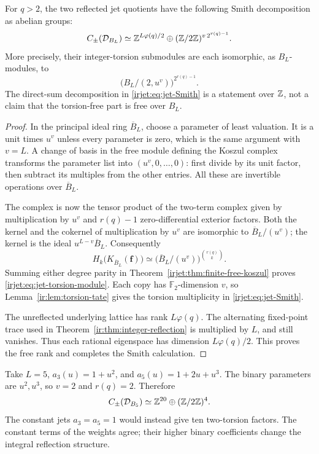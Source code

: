 \begin{theorem}
\label{irjet:thm:jets}
For $q>2$, the two reflected jet quotients have the following Smith
decomposition as abelian groups:
\begin{equation}
 C_\pm(\mathcal D_{B_L})\simeq
 \mathbb{Z}^{L\varphi(q)/2}\oplus(\mathbb{Z}/2\mathbb{Z})^{v\,2^{r(q)-1}}.
 \label{irjet:eq:jet-Smith}
\end{equation}
More precisely, their integer-torsion submodules are each isomorphic,
as $B_L$-modules, to
\begin{equation}
 \bigl(B_L/(2,u^v)\bigr)^{2^{r(q)-1}}.
 \label{irjet:eq:jet-torsion-module}
\end{equation}
The direct-sum decomposition in \eqref{irjet:eq:jet-Smith} is a statement over
$\mathbb{Z}$, not a claim that the torsion-free part is free over $B_L$.
\end{theorem}
\begin{proof}
In the principal ideal ring $\overline B_L$, choose a parameter of least
valuation. It is a unit times $u^v$ unless every parameter is zero,
which is the same argument with $v=L$. A change of basis in the free
module defining the Koszul complex transforms the parameter list into
$(u^v,0,\ldots,0)$: first divide by its unit factor, then subtract its
multiples from the other entries. All these are invertible operations
over $\overline B_L$.

The complex is now the tensor product of the two-term complex given by
multiplication by $u^v$ and $r(q)-1$ zero-differential exterior factors.
Both the kernel and the cokernel of multiplication by $u^v$ are
isomorphic to $\overline B_L/(u^v)$; the kernel is the ideal
$u^{L-v}\overline B_L$. Consequently
\[
 H_k\bigl(K_{\overline B_L}(\boldsymbol f)\bigr)
 \simeq\bigl(\overline B_L/(u^v)\bigr)^{\binom{r(q)}{k}}.
\]
Summing either degree parity in Theorem~\ref{irjet:thm:finite-free-koszul} proves
\eqref{irjet:eq:jet-torsion-module}. Each copy has $\mathbb F_2$-dimension $v$,
so Lemma~\ref{ir:lem:torsion-tate} gives the torsion multiplicity in
\eqref{irjet:eq:jet-Smith}.

The unreflected underlying lattice has rank $L\varphi(q)$.
The alternating fixed-point trace used in
Theorem~\ref{ir:thm:integer-reflection} is multiplied by $L$, and still
vanishes. Thus each rational eigenspace has dimension
$L\varphi(q)/2$. This proves the free rank and completes the Smith
calculation.
\end{proof}

\begin{example}
Take $L=5$, $a_3(u)=1+u^2$, and $a_5(u)=1+2u+u^3$.
The binary parameters are $u^2,u^3$, so $v=2$ and $r(q)=2$. Therefore
\[
 C_\pm(\mathcal D_{B_5})\simeq\mathbb{Z}^{20}\oplus(\mathbb{Z}/2\mathbb{Z})^4.
\]
The constant jets $a_3=a_5=1$ would instead give ten two-torsion factors.
The constant terms of the weights agree; their higher binary
coefficients change the integral reflection structure.
\end{example}

